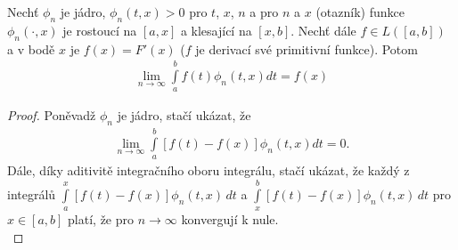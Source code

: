 \begin{theorem}[Romanovský]\label{v_4.7_Romanovsky}
Nechť $\phi_n$ je jádro, $\phi_n (t,x) > 0$ pro $t$, $x$, $n$ a pro $n$ a $x$ (otazník) funkce $\phi_n ( \cdot, x)$ je rostoucí na $[a,x]$ a klesající na $[x,b]$. Nechť dále $f \in L([a,b])$  a v bodě $x$ je $f(x) = F'(x)$ ($f$ je derivací své primitivní funkce). Potom
\begin{align}\label{vztah_4.12}
\lim_{n \rightarrow \infty} \int \limits_a^b f(t) \phi_n (t,x) dt = f(x)
\end{align}

\begin{proof}
Poněvadž $\phi_n$ je jádro, stačí ukázat, že
\begin{align}\label{vztah_4.13}
\lim_{n \rightarrow \infty} \int \limits_a^b [f(t) - f(x)] \phi_n (t,x) dt = 0.
\end{align}
Dále, díky aditivitě integračního oboru integrálu, stačí ukázat, že každý z integrál\r u $\int \limits _a^x [f(t) - f(x)] \phi_n (t,x) \, dt$ a $\int \limits _x^b [f(t) - f(x)] \phi_n (t,x) \, dt$ pro $x \in [a,b]$ platí, že pro $n \to \infty$ konvergují k nule. \\


\end{proof}
\end{theorem}
